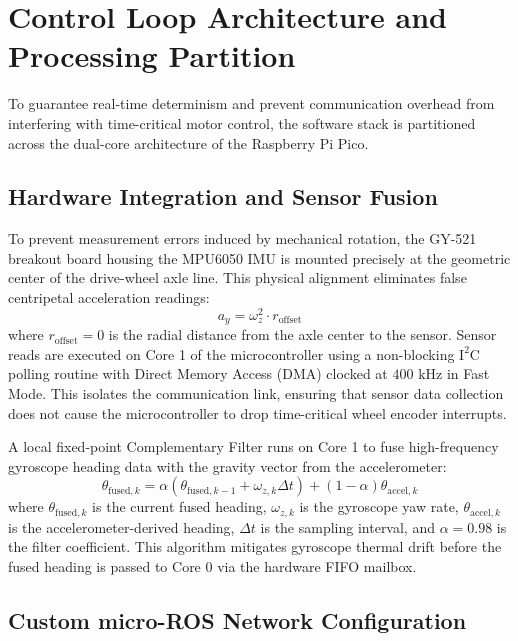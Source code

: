 \documentclass[a4paper,twoside,12pt]{report}
\begin{document}
\section{Control Loop Architecture and Processing Partition}

To guarantee real-time determinism and prevent communication overhead from interfering with time-critical motor control, the software stack is partitioned across the dual-core architecture of the Raspberry Pi Pico.

\subsection{Hardware Integration and Sensor Fusion}

To prevent measurement errors induced by mechanical rotation, the GY-521 breakout board housing the MPU6050 IMU is mounted precisely at the geometric center of the drive-wheel axle line. This physical alignment eliminates false centripetal acceleration readings:
\begin{equation}
a_y = \omega_z^2 \cdot r_{\text{offset}}
\label{eq:centripetal}
\end{equation}
where $r_{\text{offset}} = 0$ is the radial distance from the axle center to the sensor. Sensor reads are executed on Core 1 of the microcontroller using a non-blocking $\text{I}^2\text{C}$ polling routine with Direct Memory Access (DMA) clocked at $400\text{ kHz}$ in Fast Mode. This isolates the communication link, ensuring that sensor data collection does not cause the microcontroller to drop time-critical wheel encoder interrupts.

A local fixed-point Complementary Filter runs on Core 1 to fuse high-frequency gyroscope heading data with the gravity vector from the accelerometer:
\begin{equation}
\theta_{\text{fused}, k} = \alpha (\theta_{\text{fused}, k-1} + \omega_{z, k} \Delta t) + (1 - \alpha) \theta_{\text{accel}, k}
\label{eq:complementary_filter}
\end{equation}
where $\theta_{\text{fused}, k}$ is the current fused heading, $\omega_{z, k}$ is the gyroscope yaw rate, $\theta_{\text{accel}, k}$ is the accelerometer-derived heading, $\Delta t$ is the sampling interval, and $\alpha = 0.98$ is the filter coefficient. This algorithm mitigates gyroscope thermal drift before the fused heading is passed to Core 0 via the hardware FIFO mailbox.

\subsection{Custom micro-ROS Network Configuration}
\end{document}

